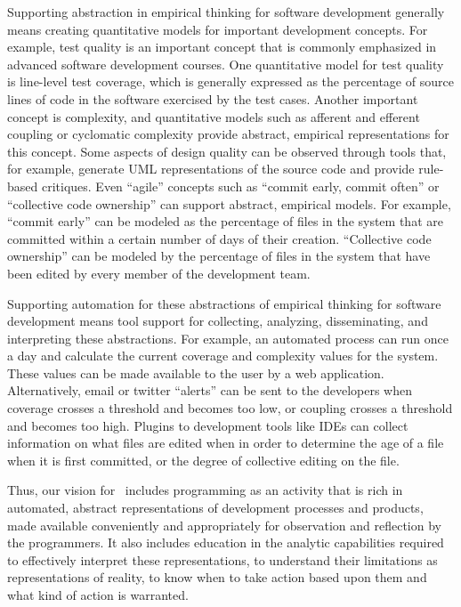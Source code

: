Supporting abstraction in empirical thinking for software development
generally means creating quantitative models for important development
concepts.  For example, test quality is an important concept that is
commonly emphasized in advanced software development courses.  One
quantitative model for test quality is line-level test coverage, which is
generally expressed as the percentage of source lines of code in the
software exercised by the test cases.  Another important concept is
complexity, and quantitative models such as afferent and efferent coupling
or cyclomatic complexity provide abstract, empirical representations for
this concept. Some aspects of design quality can be observed through tools
that, for example, generate UML representations of the source code and
provide rule-based critiques.  Even ``agile'' concepts such as ``commit
early, commit often'' or ``collective code ownership'' can support
abstract, empirical models. For example, ``commit early'' can be modeled as
the percentage of files in the system that are committed within a certain
number of days of their creation.  ``Collective code ownership'' can be
modeled by the percentage of files in the system that have been edited by
every member of the development team.

Supporting automation for these abstractions of empirical thinking for
software development means tool support for collecting, analyzing,
disseminating, and interpreting these abstractions.  For example, an
automated process can run once a day and calculate the current coverage and
complexity values for the system.  These values can be made available to
the user by a web application. Alternatively, email or twitter ``alerts''
can be sent to the developers when coverage crosses a threshold and becomes
too low, or coupling crosses a threshold and becomes too high.  Plugins to
development tools like IDEs can collect information on what files are
edited when in order to determine the age of a file when it is first
committed, or the degree of collective editing on the file.

Thus, our vision for \eCT\ includes programming as an activity that is rich
in automated, abstract representations of development processes and
products, made available conveniently and appropriately for observation and
reflection by the programmers.  It also includes education in the analytic
capabilities required to effectively interpret these representations, to
understand their limitations as representations of reality, to know when to
take action based upon them and what kind of action is warranted.

